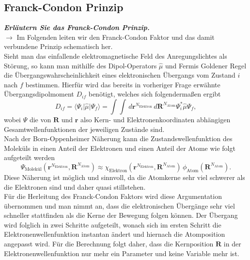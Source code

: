 \subsection{\label{subsec:FZV2}Franck-Condon Prinzip}
\textbf{\textit{Erläutern Sie das Franck-Condon Prinzip.}} \\
$\rightarrow$
Im Folgenden leiten wir den Franck-Condon Faktor und das damit verbundene Prinzip 
schematisch her. \\ 
Sieht man das einfallende elektromagnetische Feld des Anregungslichtes als 
Störung, so kann man mithilfe des Dipol-Operators $\hat{\mu}$ und 
Fermis Goldener Regel die Übergangswahrscheinlichkeit eines elektronischen 
Übergangs vom Zustand $i$ nach $f$ bestimmen. \newpage
Hierfür wird das bereits 
in vorheriger Frage erwähnte Übergangsdipolmoment $D_{if}$ benötigt, welches sich 
folgendermaßen ergibt 
\begin{equation}\label{eq:deflangle}
    D_{if} = \langle\Psi_{i}\vert \hat{\mu} \vert \Psi_{f}\rangle = \int\int\,d\mathbf{r}^{N_{\text{Elektron}}}\,d\mathbf{R}^{N_{\text{Atom}}} \Psi_{i}^{*}\hat{\mu}\Psi_{f},
\end{equation}
wobei $\Psi$ die von $\mathbf{R}$ und $\mathbf{r}$ also Kern- und Elektronenkoordinaten abhängigen Gesamtwellenfunktionen 
der jeweiligen Zustände sind. \\
Nach der Born-Oppenheimer Näherung kann die Zustandswellenfunktion des Moleküls in einen Anteil der 
Elektronen und einen Anteil der Atome wie folgt aufgeteilt werden
\begin{equation}
    \Psi_{\text{Molekül}}(\mathbf{r}^{N_{\text{Elektron}}}, \mathbf{R}^{N_{\text{Atom}}}) \approx \chi_{\text{Elektron}}(\mathbf{r}^{N_{\text{Elektron}}}, \mathbf{R}^{N_{\text{Atom}}})\,\phi_{\text{Atom}}(\mathbf{R}^{N_{\text{Atom}}}).
\end{equation}
Diese Näherung ist möglich und sinnvoll, da die Atomkerne sehr viel schwerer als die Elektronen sind und daher quasi stillstehen. \\
Für die Herleitung des Franck-Condon Faktors wird diese Argumentation übernommen und man nimmt an, dass die elektronischen 
Übergänge sehr viel schneller stattfinden als die Kerne der Bewegung folgen können. Der Übergang wird folglich 
in zwei Schritte aufgeteilt, wonach sich im ersten Schritt die Elektronenwellenfunktion instantan ändert 
und hiernach die Atomposition angepasst wird. Für die Berechnung folgt daher, dass die Kernposition 
$\mathbf{R}$ in der Elektronenwellenfunktion nur mehr ein Parameter und keine Variable mehr ist. \\
